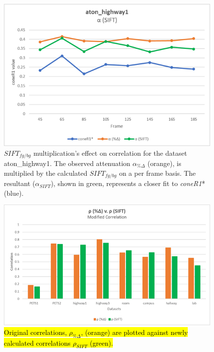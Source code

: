 \begin{figure}
  \centering
  \includegraphics[width=.8\linewidth]{figures/highway1_sift.jpg}
\caption{$SIFT_{fg/bg}$ multiplication's effect on correlation for the dataset aton\_highway1. The observed attenuation $\alpha_{\%\Delta}$ (orange), is multiplied by the calculated $SIFT_{fg/bg}$ on a per frame basis. The resultant ($\alpha_{SIFT}$), shown in green, represents a closer fit to \textit{coneR1}* (blue).}
\label{fig:highway1_sift}
\end{figure}

\begin{figure}
  \includegraphics[width=1\linewidth]{figures/sift_correlation_diff.jpg}
\caption{\hl{Original correlations, $\rho_{\%\Delta}$, (orange) are plotted against newly calculated correlations $\rho_{SIFT}$ (green).}}
\label{fig:corr_diff_sift}
\end{figure}

